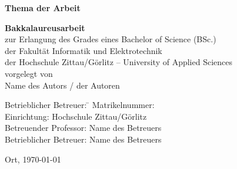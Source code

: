  \begin{titlepage}

\begin{center}
\end{center}
	\vspace{2cm}
      \enlargethispage{3cm}
      \begin{center}
          {\LARGE \textbf{Thema der Arbeit}}
          \vspace{3cm}
          \begin{flushleft}
              {\large \textbf{Bakkalaureusarbeit}}\\[1cm]
              zur Erlangung des Grades eines Bachelor of Science (BSc.)\\
              der Fakult\"{a}t Informatik und Elektrotechnik \\
              der Hochschule Zittau/G\"{o}rlitz -- University of Applied Sciences\\[3cm]

          vorgelegt von \\[1cm]
          {\large Name des Autors / der Autoren} \\
	

          {    \begin{tabbing}

	    
                Betrieblicher Betreuer: \= \kill
		 Matrikelnummer:  \\
				Einrichtung: \> Hochschule Zittau/Görlitz \\
                Betreuender Professor: \> Name des Betreuers\\
                Betrieblicher Betreuer: \> Name des Betreuers\\
            \end{tabbing}}
          \vfill
              Ort, \today
          \end{flushleft}


      \end{center}
      \setcounter{page}{-1}
  \end{titlepage}